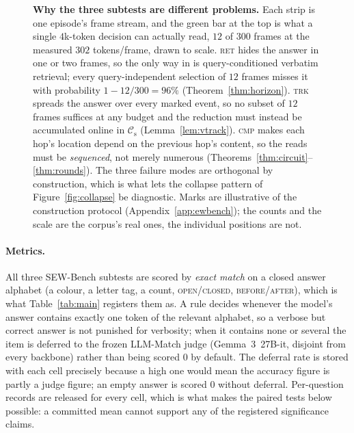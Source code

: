 \documentclass[10pt]{article}
\theoremstyle{definition}
\theoremstyle{plain}
\newcommand{\cs}{\mathcal{C}_{\mathrm{s}}}
\newcommand{\cv}{\mathcal{C}_{\mathrm{v}}}
\begin{document}
\begin{figure}[!t]
\caption{\textbf{Why the three subtests are different problems.} Each strip is one episode's frame stream, and the green bar at the top is what a single $4$k-token decision can actually read, $12$ of $300$ frames at the measured $302$ tokens/frame, drawn to scale. \textsc{ret} hides the answer in one or two frames, so the only way in is query-conditioned verbatim retrieval; every query-independent selection of $12$ frames misses it with probability $1-12/300=96\%$ (Theorem~\ref{thm:horizon}). \textsc{trk} spreads the answer over every marked event, so no subset of $12$ frames suffices at any budget and the reduction must instead be accumulated online in $\cs$ (Lemma~\ref{lem:vtrack}). \textsc{cmp} makes each hop's location depend on the previous hop's content, so the reads must be \emph{sequenced}, not merely numerous (Theorems~\ref{thm:circuit}--\ref{thm:rounds}). The three failure modes are orthogonal by construction, which is what lets the collapse pattern of Figure~\ref{fig:collapse} be diagnostic. Marks are illustrative of the construction protocol (Appendix~\ref{app:ewbench}); the counts and the scale are the corpus's real ones, the individual positions are not.}
\label{fig:witness}
\end{figure}


\paragraph{Metrics.} All three SEW-Bench subtests are scored by \emph{exact match} on a closed answer alphabet (a colour, a letter tag, a count, \textsc{open}/\textsc{closed}, \textsc{before}/\textsc{after}), which is what Table~\ref{tab:main} registers them as. A rule decides whenever the model's answer contains exactly one token of the relevant alphabet, so a verbose but correct answer is not punished for verbosity; when it contains none or several the item is deferred to the frozen LLM-Match judge (Gemma~3~27B-it, disjoint from every backbone) rather than being scored $0$ by default. The deferral rate is stored with each cell precisely because a high one would mean the accuracy figure is partly a judge figure; an empty answer is scored $0$ without deferral. Per-question records are released for every cell, which is what makes the paired tests below possible: a committed mean cannot support any of the registered significance claims.
\end{document}

